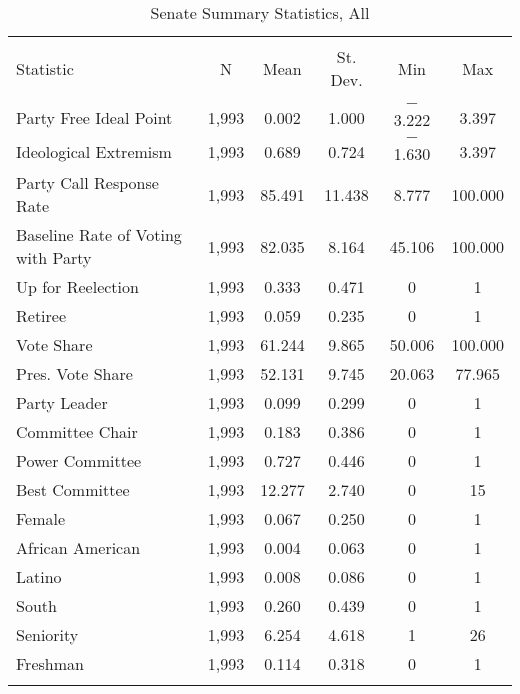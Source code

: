 \documentclass[12pt]{article}
\begin{document}
\begin{table}[H] 
	\centering 
	\singlespacing
	\caption{Senate Summary Statistics, All} 
	\label{} 
	\begin{tabular}{@{\extracolsep{5pt}}lccccc} 
		\\[-1.8ex]\hline 
		\hline \\[-1.8ex] 
		Statistic & \multicolumn{1}{c}{N} & \multicolumn{1}{c}{Mean} & \multicolumn{1}{c}{St. Dev.} & \multicolumn{1}{c}{Min} & \multicolumn{1}{c}{Max} \\ 
		\hline \\[-1.8ex] 
		Party Free Ideal Point & 1,993 & 0.002 & 1.000 & $-$3.222 & 3.397 \\ 
		Ideological Extremism & 1,993 & 0.689 & 0.724 & $-$1.630 & 3.397 \\ 
		Party Call Response Rate & 1,993 & 85.491 & 11.438 & 8.777 & 100.000 \\ 
		Baseline Rate of Voting with Party & 1,993 & 82.035 & 8.164 & 45.106 & 100.000 \\ 
		Up for Reelection & 1,993 & 0.333 & 0.471 & 0 & 1 \\ 
		Retiree & 1,993 & 0.059 & 0.235 & 0 & 1 \\ 
		Vote Share & 1,993 & 61.244 & 9.865 & 50.006 & 100.000 \\ 
		Pres. Vote Share & 1,993 & 52.131 & 9.745 & 20.063 & 77.965 \\ 
		Party Leader & 1,993 & 0.099 & 0.299 & 0 & 1 \\ 
		Committee Chair & 1,993 & 0.183 & 0.386 & 0 & 1 \\ 
		Power Committee & 1,993 & 0.727 & 0.446 & 0 & 1 \\ 
		Best Committee & 1,993 & 12.277 & 2.740 & 0 & 15 \\ 
		Female & 1,993 & 0.067 & 0.250 & 0 & 1 \\ 
		African American & 1,993 & 0.004 & 0.063 & 0 & 1 \\ 
		Latino & 1,993 & 0.008 & 0.086 & 0 & 1 \\ 
		South & 1,993 & 0.260 & 0.439 & 0 & 1 \\ 
		Seniority & 1,993 & 6.254 & 4.618 & 1 & 26 \\ 
		Freshman & 1,993 & 0.114 & 0.318 & 0 & 1 \\ 
		
		\hline \\[-1.8ex] 
	\end{tabular} 
\end{table} 
\end{document}
